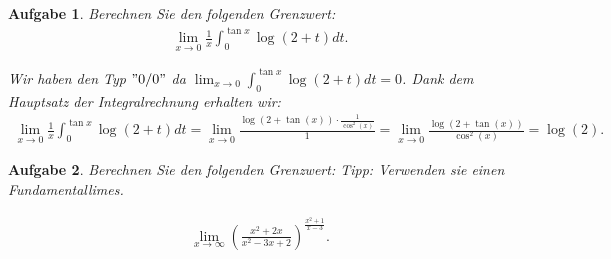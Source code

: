 \documentclass[a4paper, 20]{exam}
\newtheorem{ex}{Aufgabe}
\begin{document}
\begin{ex} Berechnen Sie den folgenden Grenzwert: 
\begin{align*}
\lim_{x \rightarrow 0} \frac{1}{x} \int_0^{\tan x} \log(2+t)dt.
\end{align*}
\begin{solution} Wir haben den Typ $"0/0"$ da $\lim_{x \rightarrow 0} \int_0^{ \tan x} \log (2 +t) dt =0$. Dank dem Hauptsatz der Integralrechnung erhalten wir:
\begin{align*}
\lim_{x \rightarrow 0} \frac{1}{x} \int_0^{\tan x} \log(2+t)dt = \lim_{x \rightarrow 0} \frac{\log(2 + \tan (x)) \cdot \frac{1}{\cos^2 (x)}}{1} = \lim_{x \rightarrow 0} \frac{\log(2 + \tan(x))}{\cos^2 (x)}= \log(2).
\end{align*}
\end{solution}
\end{ex}


\begin{ex} Berechnen Sie den folgenden Grenzwert: Tipp: Verwenden sie einen Fundamentallimes.

\begin{align*}
\lim_{x \rightarrow \infty} \left( \frac{x^2 +2x}{x^2-3x+2}\right)^{ \frac{x^2 +1}{x-3}}.
\end{align*}

\end{ex}
\end{document}

